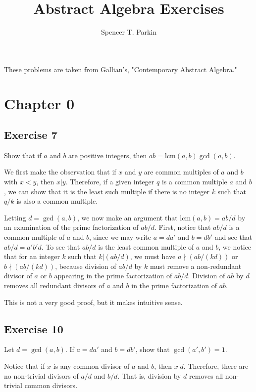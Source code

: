 \documentclass[12pt]{article}
\title{Abstract Algebra Exercises}
\author{Spencer T. Parkin}
\newcommand{\lcm}{\mbox{lcm}}
\begin{document}
\maketitle

These problems are taken from Gallian's, "Contemporary Abstract Algebra."

\section*{Chapter 0}

\subsection*{Exercise 7}

Show that if $a$ and $b$ are positive integers, then $ab=\lcm(a,b)\gcd(a,b)$.

We first make the observation that if $x$ and $y$ are common
multiples of $a$ and $b$ with $x<y$, then $x|y$.  Therefore,
if a given integer $q$ is a common multiple $a$ and $b$, we can
show that it is the least such multiple if there is no integer $k$
such that $q/k$ is also a common multiple.

Letting $d=\gcd(a,b)$,
we now make an argument that $\lcm(a,b)=ab/d$ by an examination
of the prime factorization of $ab/d$.  First, notice that $ab/d$ is a
common multiple of $a$ and $b$, since we may write $a=da'$ and
$b=db'$ and see that $ab/d = a'b'd$.  To see that $ab/d$ is the least common multiple
of $a$ and $b$, we notice that for an integer $k$ such that $k|(ab/d)$, we must
have $a\nmid(ab/(kd))$ or $b\nmid(ab/(kd))$, because division
of $ab/d$ by $k$ must remove a non-redundant divisor of $a$ or $b$ appearing in
the prime factorization of $ab/d$.
Division of $ab$ by $d$ removes all redundant divisors of $a$ and $b$
in the prime factorization of $ab$.

This is not a very good proof, but it makes intuitive sense.

\subsection*{Exercise 10}

Let $d=\gcd(a,b)$.  If $a=da'$ and $b=db'$, show that $\gcd(a',b')=1$.

Notice that if $x$ is any common divisor of $a$ and $b$, then $x|d$.
Therefore, there are no non-trivial divisors of $a/d$ and $b/d$.  That is,
division by $d$ removes all non-trivial common divisors.
\end{document}
